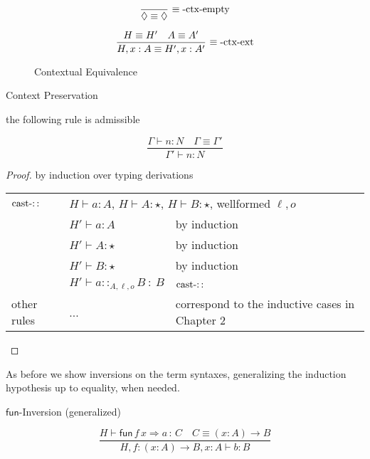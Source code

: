 \begin{figure}
\[
\frac{\ }{\lozenge\equiv\lozenge}\,\rulename{\ensuremath{\equiv}-ctx-empty}
\]

\[
\frac{H\equiv H'\quad A\equiv A'}{H,x:A\equiv H',x:A'}\,\operatorname{\equiv-ctx-ext}
\]

\caption{Contextual Equivalence}
\label{fig:surface-Context-Equiv}
\end{figure}

\begin{lem}
Context Preservation

the following rule is admissible

\[
\frac{\Gamma\vdash n:N\quad\Gamma\equiv\Gamma'}{\Gamma'\vdash n:N}
\]
\end{lem}

\begin{proof}
by induction over typing derivations

\begin{tabular}{lll}
$\operatorname{cast-::}$ & \multicolumn{2}{l}{$H\vdash a:A$, $H\vdash A:\star$, $H\vdash B:\star$, wellformed
$\ensuremath{\ell},o$}\tabularnewline
 & $H'\vdash a:A$ & by induction\tabularnewline
 & $H'\vdash A:\star$ & by induction\tabularnewline
 & $H'\vdash B:\star$ & by induction\tabularnewline
 & $H'\vdash a::_{A,\ensuremath{\ell},o}B\::\:B$ & $\operatorname{cast-::}$\tabularnewline
other rules & ... & correspond to the inductive cases in Chapter 2\tabularnewline
\end{tabular}
\end{proof}
As before we show inversions on the term syntaxes, generalizing the induction hypothesis up to equality, when needed.
\begin{lem}
$\mathsf{fun}$-Inversion (generalized)

\[
\frac{H\vdash\mathsf{fun}\,f\,x\Rightarrow a\,:\,C\quad C\equiv\left(x:A\right)\rightarrow B}{H,f:\left(x:A\right)\rightarrow B,x:A\vdash b:B}
\]
\end{lem}

